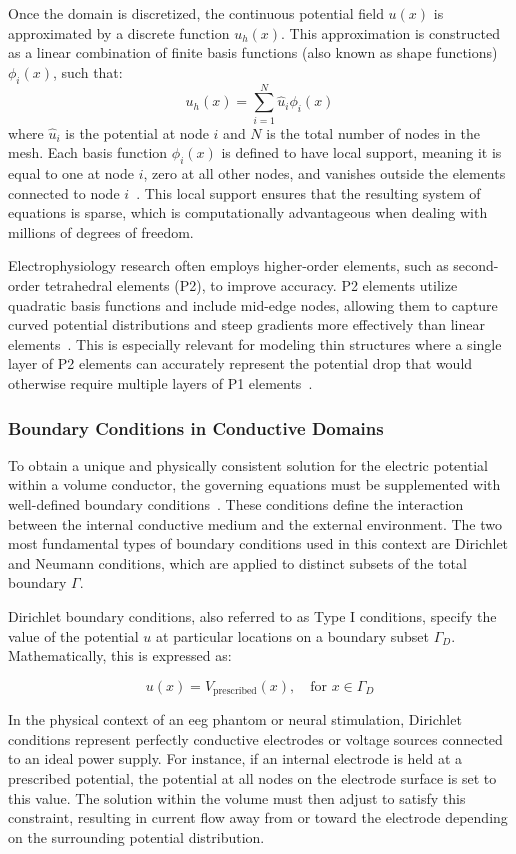 Once the domain is discretized, the continuous potential field $u(x)$ is approximated by a discrete function $u_h(x)$. This approximation is constructed as a linear combination of finite basis functions (also known as shape functions) $\phi_i(x)$, such that:
$$u_h(x) = \sum_{i=1}^{N} \hat{u}_i \phi_i(x)$$
where $\hat{u}_i$ is the potential at node $i$ and $N$ is the total number of nodes in the mesh. Each basis function $\phi_i(x)$ is defined to have local support, meaning it is equal to one at node $i$, zero at all other nodes, and vanishes outside the elements connected to node $i$~\cite{fem-org}. This local support ensures that the resulting system of equations is sparse, which is computationally advantageous when dealing with millions of degrees of freedom\cite{hallez-2007}.

Electrophysiology research often employs higher-order elements, such as second-order tetrahedral elements (P2), to improve accuracy. P2 elements utilize quadratic basis functions and include mid-edge nodes, allowing them to capture curved potential distributions and steep gradients more effectively than linear elements~\cite{erdbrugger-2023}. This is especially relevant for modeling thin structures where a single layer of P2 elements can accurately represent the potential drop that would otherwise require multiple layers of P1 elements~\cite{zhang-2004}.

\subsubsection{Boundary Conditions in Conductive Domains}
To obtain a unique and physically consistent solution for the electric potential within a volume conductor, the governing equations must be supplemented with well-defined boundary conditions~\cite{simscale-boundary-conditions}. These conditions define the interaction between the internal conductive medium and the external environment. The two most fundamental types of boundary conditions used in this context are Dirichlet and Neumann conditions, which are applied to distinct subsets of the total boundary $\Gamma$.

Dirichlet boundary conditions, also referred to as Type I conditions, specify the value of the potential $u$ at particular locations on a boundary subset $\Gamma_D$. Mathematically, this is expressed as:

$$u(x) = V_{\text{prescribed}}(x), \quad \text{for } x \in \Gamma_D$$

In the physical context of an \gls{eeg} phantom or neural stimulation, Dirichlet conditions represent perfectly conductive electrodes or voltage sources connected to an ideal power supply. For instance, if an internal electrode is held at a prescribed potential, the potential at all nodes on the electrode surface is set to this value. The solution within the volume must then adjust to satisfy this constraint, resulting in current flow away from or toward the electrode depending on the surrounding potential distribution.

